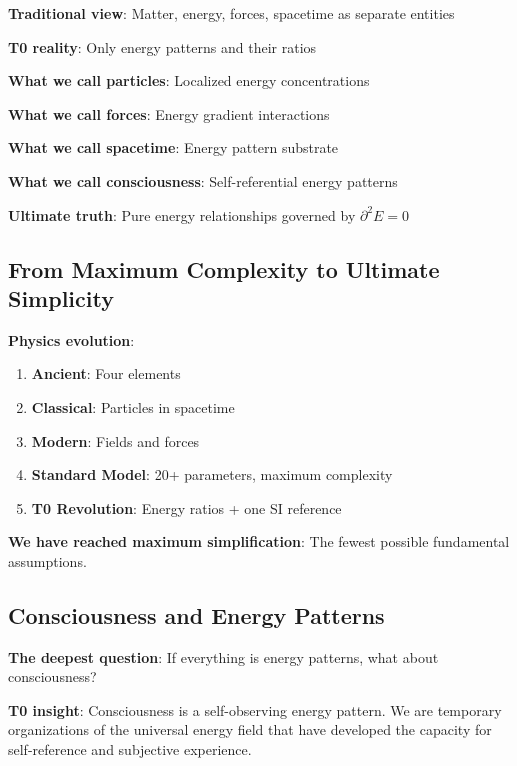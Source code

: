 \documentclass[12pt,a4paper]{article}
\newcommand{\Efield}{E}
\theoremstyle{definition}
\theoremstyle{remark}
\begin{document}
	\begin{tcolorbox}[colback=purple!5!white,colframe=purple!75!black,title=The Ultimate Dematerialization]
		\textbf{Traditional view}: Matter, energy, forces, spacetime as separate entities
		
		\textbf{T0 reality}: Only energy patterns and their ratios
		
		\textbf{What we call particles}: Localized energy concentrations
		
		\textbf{What we call forces}: Energy gradient interactions
		
		\textbf{What we call spacetime}: Energy pattern substrate
		
		\textbf{What we call consciousness}: Self-referential energy patterns
		
		\textbf{Ultimate truth}: Pure energy relationships governed by $\partial^2 \Efield = 0$
	\end{tcolorbox}
	
	\subsection{From Maximum Complexity to Ultimate Simplicity}
	
	\textbf{Physics evolution}:
	\begin{enumerate}
		\item \textbf{Ancient}: Four elements
		\item \textbf{Classical}: Particles in spacetime
		\item \textbf{Modern}: Fields and forces
		\item \textbf{Standard Model}: 20+ parameters, maximum complexity
		\item \textbf{T0 Revolution}: Energy ratios + one SI reference
		\end{enumerate}
		
		\textbf{We have reached maximum simplification}: The fewest possible fundamental assumptions.
		
		\subsection{Consciousness and Energy Patterns}
		
		\textbf{The deepest question}: If everything is energy patterns, what about consciousness?
			
			\textbf{T0 insight}: Consciousness is a self-observing energy pattern. We are temporary organizations of the universal energy field that have developed the capacity for self-reference and subjective experience.
			
\end{document}
